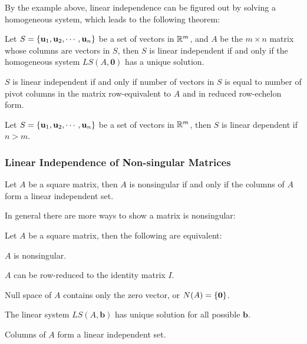 \documentclass[a4paper,12pt]{article}
\begin{document}
By the example above, linear independence can be figured out by solving a homogeneous system, which leads to the following theorem:\n

\begin{thm}
  Let $S=\left\{ \mathbf{u}_{1},\mathbf{u}_{2},\cdots,\mathbf{u}_{n}\right\}$ be a set of vectors in $\mathbb{R}^{m}$, and $A$ be the $m\times n$ matrix whose columns are vectors in $S$, then $S$ is linear independent if and only if the homogeneous system $LS(A,\mathbf{0})$ has a unique solution.
\end{thm}\n

\begin{crl}
  $S$ is linear independent if and only if number of vectors in $S$ is equal to number of pivot columns in the matrix row-equivalent to $A$ and in reduced row-echelon form.
\end{crl}\n

\begin{thm}
  Let $S=\left\{ \mathbf{u}_{1},\mathbf{u}_{2},\cdots,\mathbf{u}_{n}\right\}$ be a set of vectors in $\mathbb{R}^{m}$, then $S$ is linear dependent if $n>m$.
\end{thm}

\subsubsection{Linear Independence of Non-singular Matrices}
\begin{thm}
  Let $A$ be a square matrix, then $A$ is nonsingular if and only if the columns of $A$ form a linear independent set.
\end{thm}\n

In general there are more ways to show a matrix is nonsingular:\n

\begin{pst}
  Let $A$ be a square matrix, then the following are equivalent:

  \begin{alist}
    \item $A$ is nonsingular.
    \item $A$ can be row-reduced to the identity matrix $I$.
    \item Null space of $A$ contains only the zero vector, or $N(A)=\left\{ \mathbf{0}\right\}$.
    \item The linear system $LS(A,\mathbf{b})$ has unique solution for all possible $\mathbf{b}$.
    \item Columns of $A$ form a linear independent set.
  \end{alist}
\end{pst}\n
\end{document}

